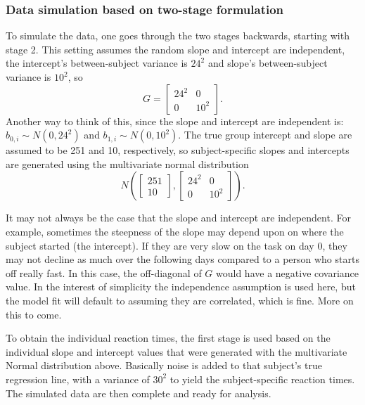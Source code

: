 \documentclass[
]{book}
\begin{document}
\hypertarget{data-simulation-based-on-two-stage-formulation}{%
\subsubsection*{Data simulation based on two-stage formulation}\label{data-simulation-based-on-two-stage-formulation}}

To simulate the data, one goes through the two stages backwards, starting with stage 2. This setting assumes the random slope and intercept are independent, the intercept's between-subject variance is \(24^2\) and slope's between-subject variance is \(10^2\), so \[G=\left[\begin{array}{cc} 24^2 & 0 \\ 0 & 10^2 \end{array}\right].\] Another way to think of this, since the slope and intercept are independent is: \(b_{0,i}\sim N(0, 24^2)\) and \(b_{1,i}\sim N(0, 10^2)\). The true group intercept and slope are assumed to be 251 and 10, respectively, so subject-specific slopes and intercepts are generated using the multivariate normal distribution
\[N\left(\left[\begin{array}{c} 251 \\ 10 \end{array}\right], \left[\begin{array}{cc} 24^2 & 0 \\ 0 & 10^2 \end{array}\right]\right).\]

It may not always be the case that the slope and intercept are independent. For example, sometimes the steepness of the slope may depend upon on where the subject started (the intercept). If they are very slow on the task on day 0, they may not decline as much over the following days compared to a person who starts off really fast. In this case, the off-diagonal of \(G\) would have a negative covariance value. In the interest of simplicity the independence assumption is used here, but the model fit will default to assuming they are correlated, which is fine. More on this to come.

To obtain the individual reaction times, the first stage is used based on the individual slope and intercept values that were generated with the multivariate Normal distribution above. Basically noise is added to that subject's true regression line, with a variance of \(30^2\) to yield the subject-specific reaction times. The simulated data are then complete and ready for analysis.
\end{document}
